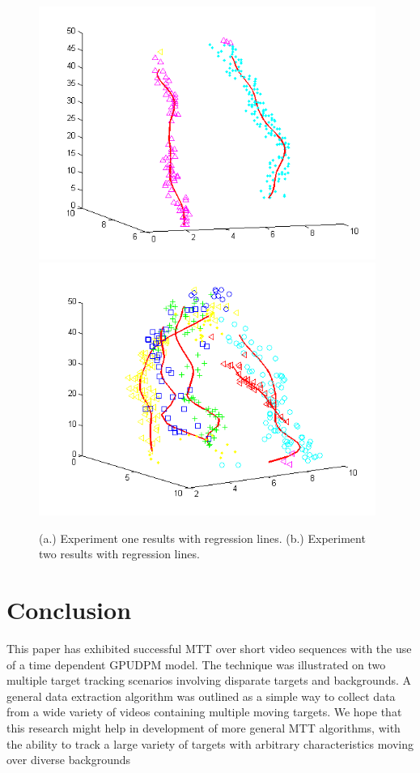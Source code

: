 \documentclass{article}
\begin{document}
\begin{figure}
\centering
{\includegraphics[width=110mm]{exp1_regression.png}}
\hspace{8mm}
{\includegraphics[width=110mm]{exp2_regression.png}}
\caption{(a.) Experiment one results with regression lines. (b.) Experiment two results with regression lines.}
\label{test}
\end{figure}






\section{Conclusion}
This paper has exhibited successful MTT over short video sequences with the use of a time dependent GPUDPM model. The technique was illustrated on two multiple target tracking scenarios involving disparate targets and backgrounds. A general data extraction algorithm was outlined as a simple way to collect data from a wide variety of videos containing multiple moving targets. We hope that this research might help in development of more general MTT algorithms, with the ability to track a large variety of targets with arbitrary characteristics moving over diverse backgrounds 






\begin{small}

 
\end{small}
\end{document}
